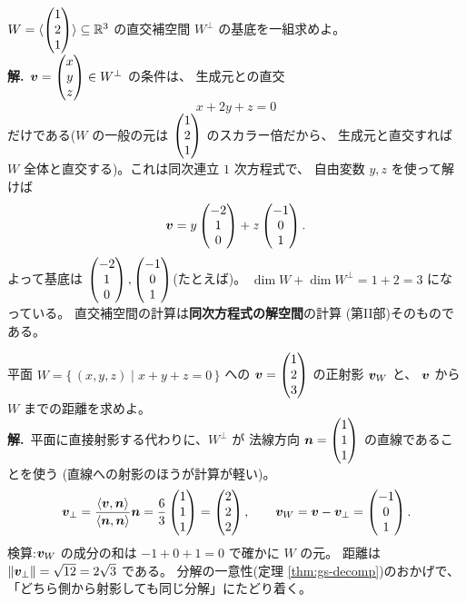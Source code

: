 \begin{rei}[例題・標準(直交補空間)]\label{rei:gs-perpcalc}
$W = \langle \begin{pmatrix}1 \\ 2 \\ 1\end{pmatrix} \rangle \subseteq \mathbb{R}^3$ の直交補空間
$W^{\perp}$ の基底を一組求めよ。\\
\textbf{解.}\ $\bm{v} = \begin{pmatrix}x \\ y \\ z\end{pmatrix} \in W^{\perp}$ の条件は、
生成元との直交
\[
x + 2y + z = 0
\]
だけである($W$ の一般の元は $\begin{pmatrix}1\\2\\1\end{pmatrix}$ のスカラー倍だから、
生成元と直交すれば $W$ 全体と直交する)。これは同次連立 $1$ 次方程式で、
自由変数 $y, z$ を使って解けば
\[
\bm{v} = y\begin{pmatrix}-2 \\ 1 \\ 0\end{pmatrix} + z\begin{pmatrix}-1 \\ 0 \\ 1\end{pmatrix}.
\]
よって基底は $\begin{pmatrix}-2 \\ 1 \\ 0\end{pmatrix}, \begin{pmatrix}-1 \\ 0 \\ 1\end{pmatrix}$(たとえば)。
$\dim W + \dim W^{\perp} = 1 + 2 = 3$ になっている。
直交補空間の計算は\textbf{同次方程式の解空間}の計算
(第II部)そのものである。
\end{rei}

\begin{rei}[例題・標準(平面への正射影と距離)]\label{rei:gs-projplane}
平面 $W = \{\, (x, y, z) \mid x + y + z = 0 \,\}$ への
$\bm{v} = \begin{pmatrix}1 \\ 2 \\ 3\end{pmatrix}$ の正射影 $\bm{v}_W$ と、
$\bm{v}$ から $W$ までの距離を求めよ。\\
\textbf{解.}\ 平面に直接射影する代わりに、$W^{\perp}$ が
法線方向 $\bm{n} = \begin{pmatrix}1 \\ 1 \\ 1\end{pmatrix}$ の直線であることを使う
(直線への射影のほうが計算が軽い)。
\[
\bm{v}_{\perp} = \frac{\langle \bm{v}, \bm{n} \rangle}{\langle \bm{n}, \bm{n} \rangle}
\bm{n} = \frac{6}{3}\begin{pmatrix}1 \\ 1 \\ 1\end{pmatrix} = \begin{pmatrix}2 \\ 2 \\ 2\end{pmatrix}, \qquad
\bm{v}_W = \bm{v} - \bm{v}_{\perp} = \begin{pmatrix}-1 \\ 0 \\ 1\end{pmatrix}.
\]
検算:$\bm{v}_W$ の成分の和は $-1 + 0 + 1 = 0$ で確かに $W$ の元。
距離は $\|\bm{v}_{\perp}\| = \sqrt{12} = 2\sqrt{3}$ である。
分解の一意性(定理 \ref{thm:gs-decomp})のおかげで、
「どちら側から射影しても同じ分解」にたどり着く。
\end{rei}

